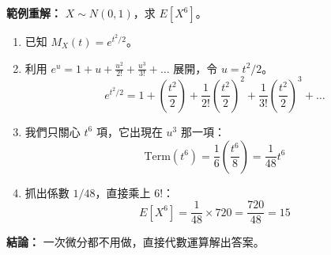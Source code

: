 \documentclass{article}
\begin{document}
\textbf{範例重解：} $X \sim N(0, 1)$，求 $E[X^6]$。
\begin{enumerate}
    \item 已知 $M_X(t) = e^{t^2/2}$。
    \item 利用 $e^u = 1 + u + \frac{u^2}{2!} + \frac{u^3}{3!} + \dots$ 展開，令 $u = t^2/2$。
    $$ e^{t^2/2} = 1 + \left(\frac{t^2}{2}\right) + \frac{1}{2!}\left(\frac{t^2}{2}\right)^2 + \frac{1}{3!}\left(\frac{t^2}{2}\right)^3 + \dots $$
    \item 我們只關心 $t^6$ 項，它出現在 $u^3$ 那一項：
    $$ \text{Term}(t^6) = \frac{1}{6} \left(\frac{t^6}{8}\right) = \frac{1}{48} t^6 $$
    \item 抓出係數 $1/48$，直接乘上 $6!$：
    $$ E[X^6] = \frac{1}{48} \times 720 = \frac{720}{48} = 15 $$
\end{enumerate}
\textbf{結論：} 一次微分都不用做，直接代數運算解出答案。
\end{document}
